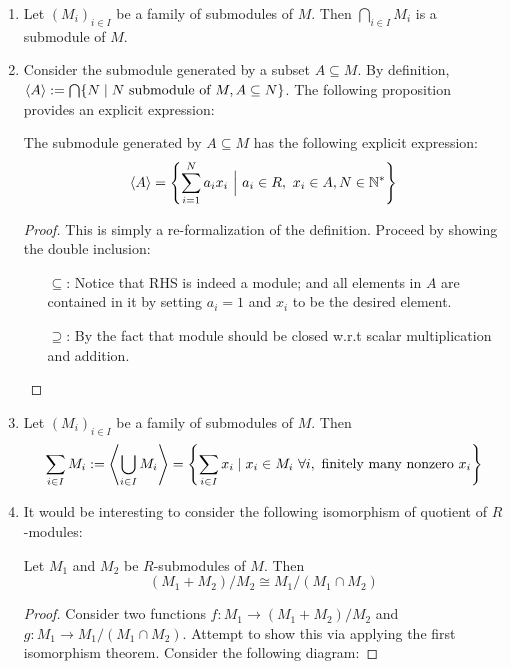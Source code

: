 \begin{enumerate}
    \item Let $(M_i)_{i\in I}$ be a family of submodules of $M$. Then $\bigcap_{i\in I} M_i$ is a submodule of $M$. 
    \item Consider the submodule generated by a subset $A \subseteq M$. By definition, $\left\langle A \right\rangle := \bigcap\{N \mid N \text{ submodule of } M, A\subseteq N\}$. The following proposition provides an explicit expression:
        \begin{proposition}\label{prop:Explicit Expression of Generated Submodules}
            The submodule generated by $A\subseteq M$ has the following explicit expression:
            \[
                \left\langle A \right\rangle = \left\{ \sum\limits_{i=1}^{N} a_i x_i \ \Big|\  a_i \in R,\ x_i\in A, N\in \mathbb{N}^* \right\}
            \]
        \end{proposition}

        \begin{proof}
            This is simply a re-formalization of the definition. Proceed by showing the double inclusion:
            \begin{itemize}
                \item[$\subseteq$:] Notice that RHS is indeed a module; and all elements in $A$ are contained in it by setting $a_i = 1$ and $x_i$ to be the desired element.
                \item[$\supseteq$:] By the fact that module should be closed w.r.t scalar multiplication and addition.
            \end{itemize}
        \end{proof}
    \item Let $(M_i)_{i\in I}$ be a family of submodules of $M$. Then
        \[
            \sum\limits_{i\in I} M_i := \left\langle \bigcup_{i\in I} M_i \right\rangle = \left\{ \sum\limits_{i\in I} x_i \mid x_i\in M_i\ \forall i, \text{ finitely many nonzero } x_i \right\}
        \]
    \item It would be interesting to consider the following isomorphism of quotient of $R$-modules:
        \begin{theorem}\label{thm:Third Isomorphism Theorem}
            Let $M_1$ and $M_2$ be $R$-submodules of $M$. Then 
            \[
                (M_1 + M_2)/M_2 \cong M_1/(M_1 \cap M_2)  
            \]
         \end{theorem}

         \begin{proof}
            Consider two functions $f: M_1 \to (M_1 + M_2)/M_2$ and $g: M_1 \to M_1/(M_1\cap M_2)$. Attempt to show this via applying the first isomorphism theorem. Consider the following diagram:
            

\end{proof}
\end{enumerate}
